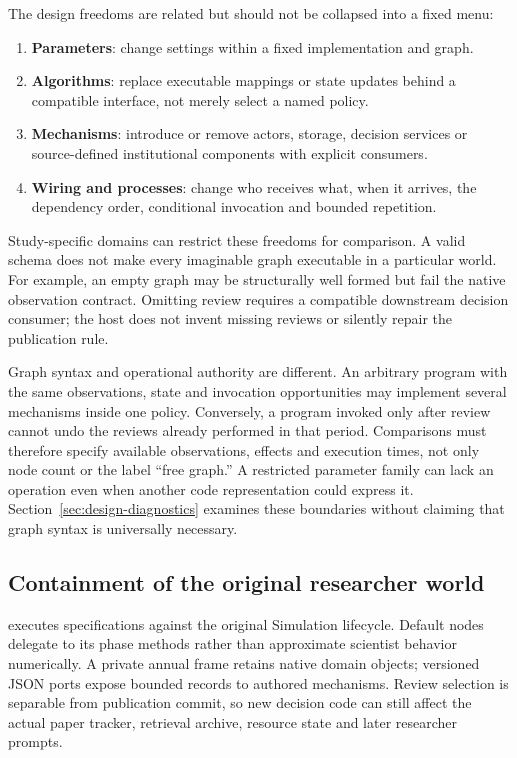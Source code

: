 The design freedoms are related but should not be collapsed into a fixed menu:
\begin{enumerate}[leftmargin=*,nosep]
 \item \textbf{Parameters}: change settings within a fixed implementation and graph.
 \item \textbf{Algorithms}: replace executable mappings or state updates behind
 a compatible interface, not merely select a named policy.
 \item \textbf{Mechanisms}: introduce or remove actors, storage, decision services
 or source-defined institutional components with explicit consumers.
 \item \textbf{Wiring and processes}: change who receives what, when it arrives,
 the dependency order, conditional invocation and bounded repetition.
\end{enumerate}
Study-specific domains can restrict these freedoms for comparison. A valid
schema does not make every imaginable graph executable in a particular world.
For example, an empty graph may be structurally well formed but fail the
native observation contract. Omitting review requires a compatible downstream
decision consumer; the host does not invent missing reviews or silently repair
the publication rule.

Graph syntax and operational authority are different. An arbitrary program
with the same observations, state and invocation opportunities may implement
several mechanisms inside one policy. Conversely, a program invoked only
after review cannot undo the reviews already performed in that period.
Comparisons must therefore specify available observations, effects and
execution times, not only node count or the label ``free graph.'' A restricted
parameter family can lack an operation even when another code representation
could express it. Section~\ref{sec:design-diagnostics} examines these boundaries
without claiming that graph syntax is universally necessary.

\subsection{Containment of the original researcher world}
 executes specifications against the original
Simulation lifecycle. Default nodes delegate to its phase methods rather than
approximate scientist behavior numerically. A private annual frame retains
native domain objects; versioned JSON ports expose bounded records to authored
mechanisms. Review selection is separable from publication commit, so new
decision code can still affect the actual paper tracker, retrieval archive,
resource state and later researcher prompts.

